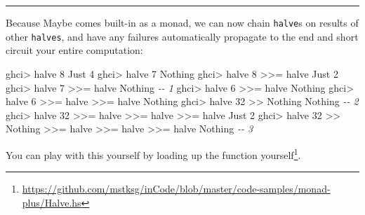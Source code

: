 \documentclass[]{article}
\newenvironment{Shaded}{}{}
\newcommand{\CommentTok}[1]{\textcolor[rgb]{0.38,0.63,0.69}{\textit{#1}}}
\newcommand{\DataTypeTok}[1]{\textcolor[rgb]{0.56,0.13,0.00}{#1}}
\newcommand{\DecValTok}[1]{\textcolor[rgb]{0.25,0.63,0.44}{#1}}
\newcommand{\NormalTok}[1]{#1}
\newcommand{\OperatorTok}[1]{\textcolor[rgb]{0.40,0.40,0.40}{#1}}
\renewcommand{\href}[2]{#2\footnote{\url{#1}}}
\begin{document}
\begin{center}\rule{0.5\linewidth}{0.5pt}\end{center}

Because Maybe comes built-in as a monad, we can now chain \texttt{halve}s on
results of other \texttt{halves}, and have any failures automatically propagate
to the end and short circuit your entire computation:

\begin{Shaded}
\begin{Highlighting}[]
\NormalTok{ghci}\OperatorTok{\textgreater{}}\NormalTok{ halve }\DecValTok{8}
\DataTypeTok{Just} \DecValTok{4}
\NormalTok{ghci}\OperatorTok{\textgreater{}}\NormalTok{ halve }\DecValTok{7}
\DataTypeTok{Nothing}
\NormalTok{ghci}\OperatorTok{\textgreater{}}\NormalTok{ halve }\DecValTok{8} \OperatorTok{\textgreater{}\textgreater{}=}\NormalTok{ halve}
\DataTypeTok{Just} \DecValTok{2}
\NormalTok{ghci}\OperatorTok{\textgreater{}}\NormalTok{ halve }\DecValTok{7} \OperatorTok{\textgreater{}\textgreater{}=}\NormalTok{ halve}
\DataTypeTok{Nothing}                         \CommentTok{{-}{-} 1}
\NormalTok{ghci}\OperatorTok{\textgreater{}}\NormalTok{ halve }\DecValTok{6} \OperatorTok{\textgreater{}\textgreater{}=}\NormalTok{ halve}
\DataTypeTok{Nothing}
\NormalTok{ghci}\OperatorTok{\textgreater{}}\NormalTok{ halve }\DecValTok{6} \OperatorTok{\textgreater{}\textgreater{}=}\NormalTok{ halve }\OperatorTok{\textgreater{}\textgreater{}=}\NormalTok{ halve}
\DataTypeTok{Nothing}
\NormalTok{ghci}\OperatorTok{\textgreater{}}\NormalTok{ halve }\DecValTok{32} \OperatorTok{\textgreater{}\textgreater{}} \DataTypeTok{Nothing}
\DataTypeTok{Nothing}                         \CommentTok{{-}{-} 2}
\NormalTok{ghci}\OperatorTok{\textgreater{}}\NormalTok{ halve }\DecValTok{32} \OperatorTok{\textgreater{}\textgreater{}=}\NormalTok{ halve }\OperatorTok{\textgreater{}\textgreater{}=}\NormalTok{ halve }\OperatorTok{\textgreater{}\textgreater{}=}\NormalTok{ halve}
\DataTypeTok{Just} \DecValTok{2}
\NormalTok{ghci}\OperatorTok{\textgreater{}}\NormalTok{ halve }\DecValTok{32} \OperatorTok{\textgreater{}\textgreater{}} \DataTypeTok{Nothing} \OperatorTok{\textgreater{}\textgreater{}=}\NormalTok{ halve }\OperatorTok{\textgreater{}\textgreater{}=}\NormalTok{ halve }\OperatorTok{\textgreater{}\textgreater{}=}\NormalTok{ halve}
\DataTypeTok{Nothing}                         \CommentTok{{-}{-} 3}
\end{Highlighting}
\end{Shaded}

You can play with this yourself by
\href{https://github.com/mstksg/inCode/blob/master/code-samples/monad-plus/Halve.hs}{loading
up the function yourself}.
\end{document}
